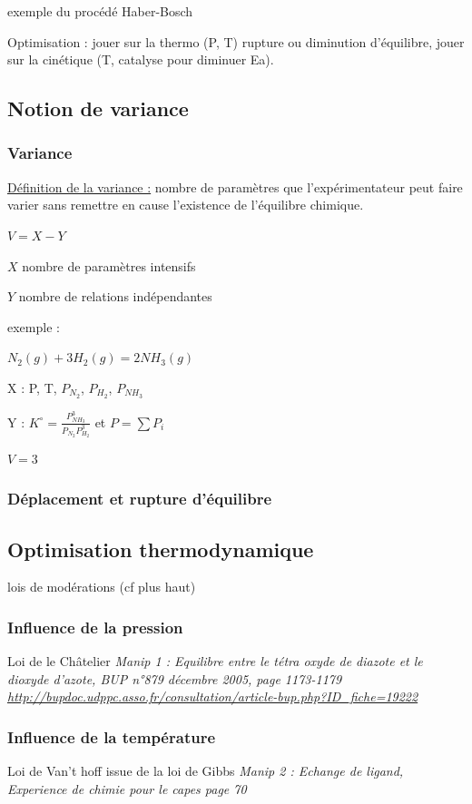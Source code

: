 \documentclass{article}%
\begin{document}
exemple du procédé Haber-Bosch

Optimisation : jouer sur la thermo (P, T) rupture ou diminution d'équilibre, jouer sur la cinétique (T, catalyse pour diminuer Ea).

\subsection{Notion de variance}
\subsubsection{Variance}

\underline{Définition de la variance :} nombre de paramètres que l'expérimentateur peut faire varier sans remettre en cause l'existence de l'équilibre chimique.

$V=X-Y$ 

$X$ nombre de paramètres intensifs

$Y$ nombre de relations indépendantes 

exemple :

$N_2(g) + 3 H_2(g) = 2 NH_3(g)$

X : P, T, $P_{N_2}$, $P_{H_2}$, $P_{NH_3}$

Y : $K^\circ=\frac{P_{NH_3}^3}{P_{N_2}P_{H_2}^3}$ et $P=\sum P_i$

$V=3$

\subsubsection{Déplacement et rupture d'équilibre}
\subsection{Optimisation thermodynamique}
lois de modérations (cf plus haut)
\subsubsection{Influence de la pression}
Loi de le Châtelier
\textit{Manip 1 : Equilibre entre le tétra oxyde de diazote et le dioxyde d’azote, BUP n°879 décembre 2005, page 1173-1179 \url{http://bupdoc.udppc.asso.fr/consultation/article-bup.php?ID\_fiche=19222}}
\subsubsection{Influence de la température}
Loi de Van't hoff issue de la loi de Gibbs
\textit{Manip 2 : Echange de ligand, Experience de chimie pour le capes page 70}
\end{document}
